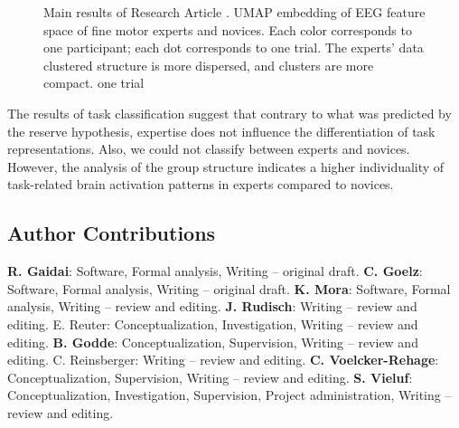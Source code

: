 \begin{figure}[h]
\begin{center}

\caption[Main results of Research Article ]{Main results of Research Article . UMAP embedding of EEG feature space of fine motor experts and novices. Each color corresponds to one participant; each dot corresponds to one trial. The experts' data clustered structure is more dispersed, and clusters are more compact. 
one trial}
\label{fig:results4}
\end{center}
\end{figure}

\noindent The results of task classification suggest that contrary to what was predicted by the reserve hypothesis, expertise does not influence the differentiation of task representations. Also, we could not classify between experts and novices. However, the analysis of the group structure indicates a higher individuality of task-related brain activation patterns in experts compared to novices.

\subsection*{Author Contributions}
\textbf{R. Gaidai}: Software, Formal analysis, Writing – original draft.
\textbf{C. Goelz}: Software, Formal analysis, Writing – original draft.
\textbf{K. Mora}: Software, Formal analysis, Writing – review and editing.  
\textbf{J. Rudisch}: Writing – review and editing. E. Reuter: Conceptualization, Investigation, Writing – review and editing.  
\textbf{B. Godde}: Conceptualization, Supervision, Writing – review and editing. C. Reinsberger: Writing – review and editing. 
\textbf{C. Voelcker-Rehage}: Conceptualization, Supervision, Writing – review and editing.  
\textbf{S. Vieluf}: Conceptualization, Investigation, Supervision, Project administration, Writing – review and 
editing.
